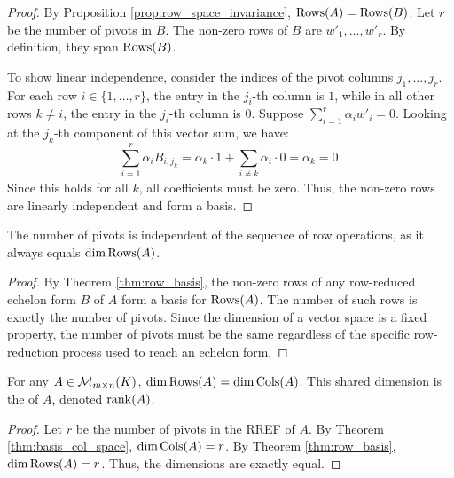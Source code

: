 \begin{proof}
By Proposition \ref{prop:row_space_invariance}, $\operatorname{Rows}(A) = \operatorname{Rows}(B)$. Let $r$ be the number of pivots in $B$. The non-zero rows of $B$ are $w'_1, \dots, w'_r$. By definition, they span $\operatorname{Rows}(B)$. 

To show linear independence, consider the indices of the pivot columns $j_1, \dots, j_r$. For each row $i \in \{1, \dots, r\}$, the entry in the $j_i$-th column is $1$, while in all other rows $k \neq i$, the entry in the $j_i$-th column is $0$. 
Suppose $\sum_{i=1}^r \alpha_i w'_i = 0$. Looking at the $j_k$-th component of this vector sum, we have:
\[ \sum_{i=1}^r \alpha_i B_{i, j_k} = \alpha_k \cdot 1 + \sum_{i \neq k} \alpha_i \cdot 0 = \alpha_k = 0. \]
Since this holds for all $k$, all coefficients must be zero. Thus, the non-zero rows are linearly independent and form a basis.
\end{proof}

\begin{corollary}
\label{cor:rank_invariance}
The number of pivots is independent of the sequence of row operations, as it always equals $\dim \operatorname{Rows}(A)$.
\end{corollary}

\begin{proof}
By Theorem \ref{thm:row_basis}, the non-zero rows of any row-reduced echelon form $B$ of $A$ form a basis for $\operatorname{Rows}(A)$. The number of such rows is exactly the number of pivots. Since the dimension of a vector space is a fixed property, the number of pivots must be the same regardless of the specific row-reduction process used to reach an echelon form.
\end{proof}

\begin{theorem}
\label{thm:rank_equality}
For any $A \in \mathcal{M}_{m \times n}(K)$, $\dim \operatorname{Rows}(A) = \dim \operatorname{Cols}(A)$. This shared dimension is the  of $A$, denoted $\operatorname{rank}(A)$.
\end{theorem}
\begin{proof}
Let $r$ be the number of pivots in the RREF of $A$. By Theorem \ref{thm:basis_col_space}, $\dim \operatorname{Cols}(A) = r$. By Theorem \ref{thm:row_basis}, $\dim \operatorname{Rows}(A) = r$. Thus, the dimensions are exactly equal.
\end{proof}